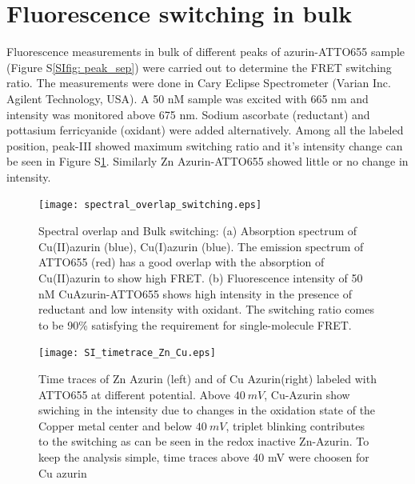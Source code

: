 \section{Fluorescence switching in bulk}
Fluorescence measurements in bulk of different peaks of azurin-ATTO655 sample (Figure S\ref{SIfig: peak_sep}) were carried out to determine the FRET switching ratio. The measurements were done in Cary Eclipse Spectrometer (Varian Inc. Agilent Technology, USA). A 50 nM sample was excited with 665 nm and intensity was monitored above 675 nm. Sodium ascorbate (reductant) and pottasium ferricyanide (oxidant) were added alternatively. Among all the labeled position, peak-III showed maximum switching ratio and it's intensity change can be seen in Figure S\ref{SIfig: switching}. Similarly Zn Azurin-ATTO655 showed little or no change in intensity.
\begin{figure}
  \centering
  \texttt{[image: spectral\_overlap\_switching.eps]}
  \makeatletter
  \renewcommand{\fnum@figure}{\figurename~S\thefigure}
  \makeatother
  \caption{Spectral overlap and Bulk switching: (a) Absorption spectrum of Cu(II)azurin (blue), Cu(I)azurin (blue). The emission spectrum of ATTO655 (red) has a good overlap with the absorption of Cu(II)azurin to show high FRET. (b) Fluorescence intensity of 50 nM CuAzurin-ATTO655 shows high intensity in the presence of reductant and low intensity with oxidant. The switching ratio comes to be 90\% satisfying the requirement for single-molecule FRET.}
  \label{SIfig: switching}
\end{figure}
\begin{figure}
  \centering
  \texttt{[image: SI\_timetrace\_Zn\_Cu.eps]}
  \makeatletter
  \renewcommand{\fnum@figure}{\figurename~S\thefigure}
  \makeatother
  \caption{Time traces of Zn Azurin (left) and of Cu Azurin(right) labeled with ATTO655 at different potential.  Above $40~mV$, Cu-Azurin show swiching in the intensity due to changes in the oxidation state of the Copper metal center and below $40~mV$, triplet blinking contributes to the switching as can be seen in the redox inactive Zn-Azurin. To keep the analysis simple, time traces above 40 mV were choosen for Cu azurin}
  \label{SIfig:tracecomparision}
\end{figure}

